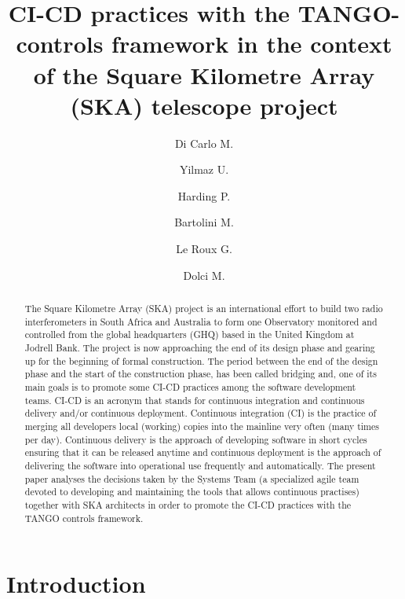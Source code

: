 \documentclass[a4paper]{spie}  %
\title{CI-CD practices with the TANGO-controls framework in the context of the Square Kilometre Array (SKA) telescope project}
\author[a]{Di Carlo M.}
\author[b]{Yilmaz U.}
\author[b]{Harding P.}
\author[b]{Bartolini M.}
\author[c]{Le Roux G.}
\author[a]{Dolci M.}
\affil[a]{INAF Osservatorio Astronomico d'Abruzzo, Teramo, Italy}
\affil[b]{SKA Organisation, Macclesfield, UK}
\affil[c]{SKA South Africa, SA}
\begin{document}
\maketitle

\begin{abstract}
The Square Kilometre Array (SKA) project is an international effort to build two radio interferometers in South Africa and Australia to form one Observatory monitored and controlled from the global headquarters (GHQ) based in the United Kingdom at Jodrell Bank. The project is now approaching the end of its design phase and gearing up for the beginning of formal construction. The period between the end of the design phase and the start of the construction phase, has been called bridging and, one of its main goals is to promote some CI-CD practices among the software development teams. CI-CD is an acronym that stands for continuous integration and continuous delivery and/or continuous deployment. Continuous integration (CI) is the practice of merging all developers local (working) copies into the mainline very often (many times per day). Continuous delivery is the approach of developing software in short cycles ensuring that it can be released anytime and continuous deployment is the approach of delivering the software into operational use frequently and automatically. The present paper analyses the decisions taken by the Systems Team (a specialized agile team devoted to developing and maintaining the tools that allows continuous practises) together with SKA architects in order to promote the CI-CD practices with the TANGO controls framework.
\end{abstract}


\section{Introduction}
\label{sec:intro}  %
\end{document}
